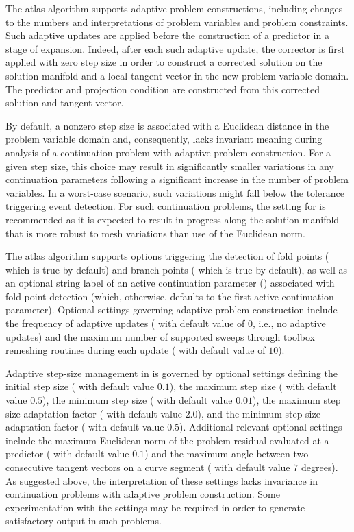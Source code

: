 The  atlas algorithm supports adaptive problem constructions, including changes to the numbers and interpretations of problem variables and problem constraints. Such adaptive updates are applied before the construction of a predictor in a stage of expansion. Indeed, after each such adaptive update, the corrector is first applied with zero step size in order to construct a corrected solution on the solution manifold and a local tangent vector in the new problem variable domain. The predictor and projection condition are constructed from this corrected solution and tangent vector. 

By default, a nonzero step size is associated with a Euclidean distance in the problem variable domain and, consequently, lacks invariant meaning during analysis of a continuation problem with adaptive problem construction. For a given step size, this choice may result in significantly smaller variations in any continuation parameters following a significant increase in the number of problem variables. In a worst-case scenario, such variations might fall below the tolerance triggering event detection. For such continuation problems, the setting  for  is recommended as it is expected to result in progress along the solution manifold that is more robust to mesh variations than use of the Euclidean norm. 

The  atlas algorithm supports options triggering the detection of fold points ( which is true by default) and branch points ( which is true by default), as well as an optional string label of an active continuation parameter () associated with fold point detection (which, otherwise, defaults to the first active continuation parameter). Optional settings governing adaptive problem construction include the frequency of adaptive updates ( with default value of $0$, i.e., no adaptive updates) and the maximum number of supported sweeps through toolbox remeshing routines during each update ( with default value of $10$).

Adaptive step-size management in  is governed by optional settings defining the initial step size ( with default value $0.1$), the maximum step size ( with default value $0.5$), the minimum step size ( with default value $0.01$), the maximum step size adaptation factor ( with default value $2.0$), and the minimum step size adaptation factor ( with default value $0.5$). Additional relevant optional settings include the maximum Euclidean norm of the problem residual evaluated at a predictor ( with default value $0.1$) and the maximum angle between two consecutive tangent vectors on a curve segment ( with default value $7$ degrees). As suggested above, the interpretation of these settings lacks invariance in continuation problems with adaptive problem construction. Some experimentation with the settings may be required in order to generate satisfactory output in such problems.

